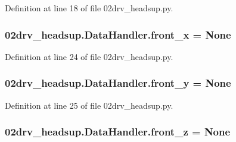 Definition at line 18 of file 02drv\+\_\+headsup.\+py.

\subsubsection[{\texorpdfstring{front\+\_\+x}{front_x}}]{\setlength{\rightskip}{0pt plus 5cm}02drv\+\_\+headsup.\+Data\+Handler.\+front\+\_\+x = None\hspace{0.3cm}{\ttfamily [static]}}\hypertarget{class02drv__headsup_1_1_data_handler_a24184b56e000f6d9ba4fd36b1a85ff13}{}\label{class02drv__headsup_1_1_data_handler_a24184b56e000f6d9ba4fd36b1a85ff13}


Definition at line 24 of file 02drv\+\_\+headsup.\+py.

\subsubsection[{\texorpdfstring{front\+\_\+y}{front_y}}]{\setlength{\rightskip}{0pt plus 5cm}02drv\+\_\+headsup.\+Data\+Handler.\+front\+\_\+y = None\hspace{0.3cm}{\ttfamily [static]}}\hypertarget{class02drv__headsup_1_1_data_handler_a0957f965871a95d838d3d14ffffb5cca}{}\label{class02drv__headsup_1_1_data_handler_a0957f965871a95d838d3d14ffffb5cca}


Definition at line 25 of file 02drv\+\_\+headsup.\+py.

\subsubsection[{\texorpdfstring{front\+\_\+z}{front_z}}]{\setlength{\rightskip}{0pt plus 5cm}02drv\+\_\+headsup.\+Data\+Handler.\+front\+\_\+z = None\hspace{0.3cm}{\ttfamily [static]}}\hypertarget{class02drv__headsup_1_1_data_handler_a4f8ceb052ad1c0b791bc50f97ca39ab7}{}\label{class02drv__headsup_1_1_data_handler_a4f8ceb052ad1c0b791bc50f97ca39ab7}


